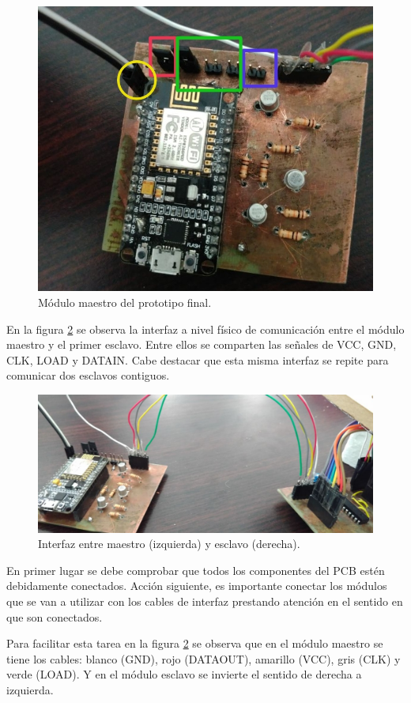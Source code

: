 \begin{figure}[!ht]
	\centering
	\includegraphics[width=0.7\linewidth]{imagenes/guia/master-rec.jpg}
	\caption{Módulo maestro del prototipo final.}
	\label{fig:guia-master}
\end{figure}

En la figura \ref{fig:interfaz-master-slave} se observa la interfaz a nivel físico de comunicación entre el módulo maestro y el primer esclavo. Entre ellos se comparten las señales de VCC, GND, CLK, LOAD y DATAIN.
Cabe destacar que esta misma interfaz se repite para comunicar dos esclavos contiguos.

\begin{figure}[!ht]
	\centering
	\includegraphics[width=\linewidth]{imagenes/guia/interfaz.jpeg}
	\caption{Interfaz entre maestro (izquierda) y esclavo (derecha).}
	\label{fig:interfaz-master-slave}
\end{figure}

En primer lugar se debe comprobar que todos los componentes del PCB estén debidamente conectados. Acción siguiente, es importante conectar los módulos que se van a utilizar con los cables de interfaz prestando atención en el sentido en que son conectados.

Para facilitar esta tarea en la figura \ref{fig:interfaz-master-slave} se observa que en el módulo maestro se tiene los cables: blanco (GND), rojo (DATAOUT), amarillo (VCC), gris (CLK) y verde (LOAD). Y en el módulo esclavo se invierte el sentido de derecha a izquierda.

